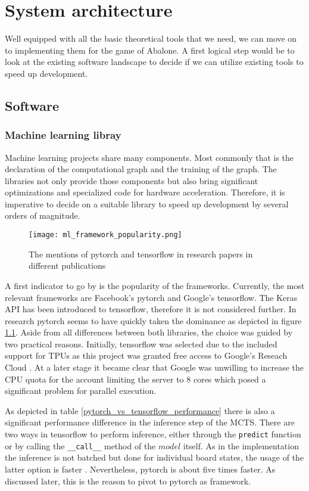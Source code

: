 \chapter{System architecture}
Well equipped with all the basic theoretical tools that we need, we can move on to implementing them for the game of Abalone. A first logical step would be to look at the existing software landscape to decide if we can utilize existing tools to speed up development.

\section{Software}
\subsection{Machine learning libray}
Machine learning projects share many components. Most commonly that is the declaration of the computational graph and the training of the graph. The libraries not only provide those components but also bring significant optimizations and specialized code for hardware acceleration. Therefore, it is imperative to decide on a suitable library to speed up development by several orders of magnitude.

\begin{figure}
    \centering
    \texttt{[image: ml\_framework\_popularity.png]}
    \caption{The mentions of pytorch and tensorflow in research papers in different publications \cite{noauthor_state_2019}}
    \label{ml_framework_popularity}
\end{figure}

A first indicator to go by is the popularity of the frameworks. Currently, the most relevant frameworks are Facebook's pytorch and Google's tensorflow. The Keras API has been introduced to tensorflow, therefore it is not considered further. In research pytorch seems to have quickly taken the dominance as depicted in figure \ref{ml_framework_popularity}. Aside from all differences between both libraries, the choice was guided by two practical reasons. Initially, tensorflow was selected due to the included support for TPUs as this project was granted free access to Google's Reseach Cloud \cite{noauthor_tpu_nodate}. At a later stage it became clear that Google was unwilling to increase the CPU quota for the account limiting the server to 8 cores which posed a significant problem for parallel execution.

As depicted in table \ref{pytorch_vs_tensorflow_performance} there is also a significant performance difference in the inference step of the MCTS. There are two ways in tensorflow to perform inference, either through the \texttt{predict} function or by calling the \texttt{\_\_call\_\_} method of the $model$ itself. As in the implementation the inference is not batched but done for individual board states, the usage of the latter option is faster \cite{noauthor_tfkerasmodel_nodate}. Nevertheless, pytorch is about five times faster. As discussed later, this is the reason to pivot to pytorch as framework.

